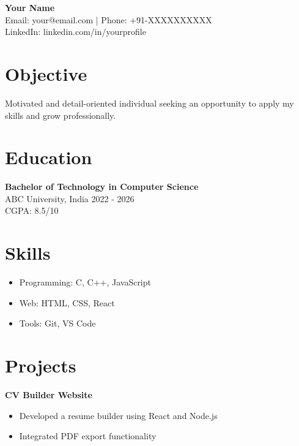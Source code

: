 \documentclass[a4paper,10pt]{article}
\begin{document}
\begin{center}
    {\LARGE \textbf{Your Name}} \\
    \vspace{2mm}
    Email: your@email.com | Phone: +91-XXXXXXXXXX \\
    LinkedIn: linkedin.com/in/yourprofile
\end{center}

\vspace{5mm}

\section*{Objective}
Motivated and detail-oriented individual seeking an opportunity to apply my skills and grow professionally.

\section*{Education}
\textbf{Bachelor of Technology in Computer Science} \\
ABC University, India \hfill 2022 - 2026 \\
CGPA: 8.5/10

\section*{Skills}
\begin{itemize}[noitemsep]
    \item Programming: C, C++, JavaScript
    \item Web: HTML, CSS, React
    \item Tools: Git, VS Code
\end{itemize}

\section*{Projects}
\textbf{CV Builder Website} \\
\begin{itemize}[noitemsep]
    \item Developed a resume builder using React and Node.js
    \item Integrated PDF export functionality
\end{itemize}
\end{document}
